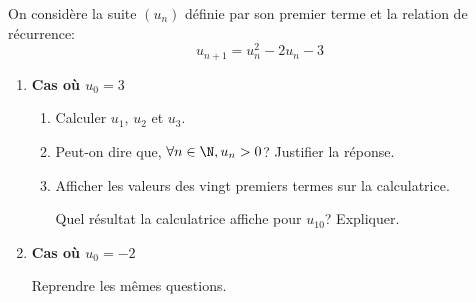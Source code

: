 \documentclass[a4paper]{article}
\begin{document}
\begin{exerciceinterro}{}{}
On considère la suite $(u_n)$ définie par son premier terme et la relation de récurrence:
$$u_{n+1}=u_n^2-2u_n-3$$
\begin{enumerate}
    \item \textbf{Cas où $u_0=3$}
    \begin{enumerate}
        \item Calculer $u_1$, $u_2$ et $u_3$.
        \item Peut-on dire que, $\forall n \in \N, u_n >0$? Justifier la réponse.
        \item Afficher les valeurs des vingt premiers termes sur la calculatrice.
        
        Quel résultat la calculatrice affiche pour $u_{10}$? Expliquer.
    \end{enumerate}
    \item \textbf{Cas où $u_0=-2$}
    
    Reprendre les mêmes questions.
\end{enumerate}

\end{exerciceinterro}
\end{document}
